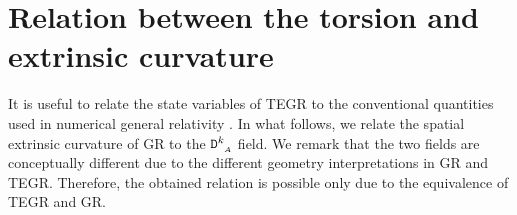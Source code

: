 \documentclass[
10pt, %
a4paper, %
oneside, %
twocolumn,
headinclude,footinclude, %
BCOR5mm, %
]{scrartcl}
\newcommand{\IP}[1]{{\color{Red}[IP:\ \ #1]}}
\newcommand{\sA}{\mathsmaller A}
\newcommand{\sB}{\mathsmaller B}
\newcommand{\pd}[1]{\partial_{#1}}
\newcommand{\MG}[1]{\kappa^{#1}}			%
\newcommand{\tetrsymbol}{h}
\newcommand{\itetrsymbol}{\eta}
\newcommand{\itetr}[2]{\itetrsymbol^{#1}_{\phantom{#1}#2}}
\newcommand{\detTetr}{\tetrsymbol}
\newcommand{\Dfin}[2]{\mathtt{D}_{\phantom{#2}#1}^{#2}}	%
\newcommand{\Hfin}[2]{\mathtt{H}_{#2#1}}	%
\newcommand{\Efin}[2]{\mathtt{E}^{#1}_{\phantom{#1}#2}}	%
\newcommand{\Hfinn}[2]{\hat{\mathtt{H}}_{{#2}{#1}}}	%
\newcommand{\Efinn}[2]{\hat{\mathtt{E}}^{#1}_{\ #2}}	%
\newcommand{\Bfin}[2]{\mathtt{B}^{#1#2}}	%
\newcommand{\LCsymb}{\bm{\in}}    %
\newcommand{\indalg}[1]{\hat{\mathsmaller{#1}}}
\newcommand{\shift}[1]{\beta^{#1}}
\begin{document}
%	
%	
%	
%	
%	
	
	
	
	\section{Relation between the torsion and extrinsic curvature}
	
	It is useful to relate the state variables of TEGR to the conventional quantities used in 
	numerical 
	general relativity \cite{ADM2008,Baumgarte2003a,Gourgoulhon2012a}. In 
	what follows, we relate the spatial extrinsic curvature of GR to the $ \Dfin{\sA}{k} $ field. 
	We remark 
	that the two fields are conceptually different due to the different geometry interpretations in 
	GR and TEGR. Therefore, the obtained relation is possible only due to the equivalence of TEGR 
	and GR. 
	
\end{document}
